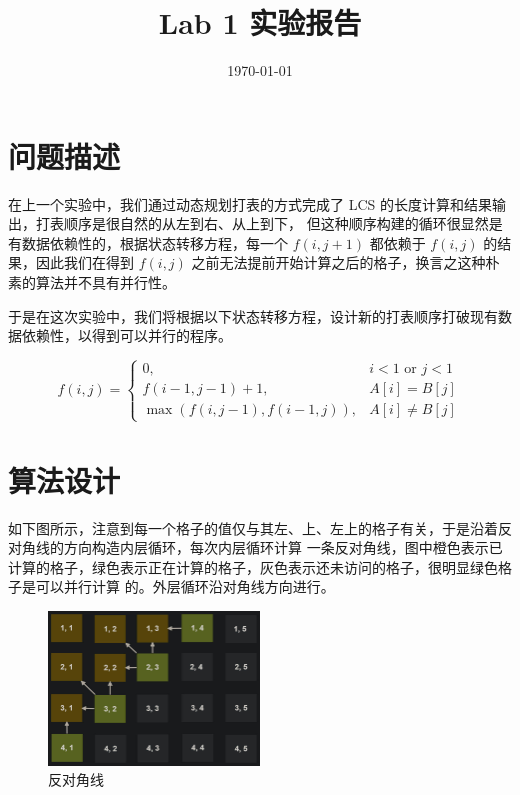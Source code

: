 \documentclass[11pt]{article}
\begin{document}
\title{\bf Lab 1 实验报告}

\author{}
\date{\today}
\maketitle


\section{问题描述}

在上一个实验中，我们通过动态规划打表的方式完成了 LCS 的长度计算和结果输出，打表顺序是很自然的从左到右、从上到下，
但这种顺序构建的循环很显然是有数据依赖性的，根据状态转移方程，每一个 $ f(i, j+1) $ 都依赖于 $ f(i, j) $ 的结
果，因此我们在得到 $ f(i, j) $ 之前无法提前开始计算之后的格子，换言之这种朴素的算法并不具有并行性。

于是在这次实验中，我们将根据以下状态转移方程，设计新的打表顺序打破现有数据依赖性，以得到可以并行的程序。

$$
	f(i, j)= \begin{cases}
		0,                           & i<1 \text { or } j<1 \\
		f(i-1, j-1)+1,               & A[i]=B[j]            \\
		\max (f(i, j-1), f(i-1, j)), & A[i] \neq B[j]
	\end{cases}
$$


\section{算法设计}

如下图所示，注意到每一个格子的值仅与其左、上、左上的格子有关，于是沿着反对角线的方向构造内层循环，每次内层循环计算
一条反对角线，图中橙色表示已计算的格子，绿色表示正在计算的格子，灰色表示还未访问的格子，很明显绿色格子是可以并行计算
的。外层循环沿对角线方向进行。

\begin{figure}[H]
	\centering
	\includegraphics[width=0.5\textwidth]{./img/parallel-1.jpg}
	\caption{反对角线}
\end{figure}
\end{document}

